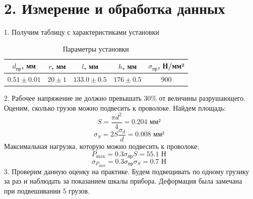 \documentclass[12pt,a4paper]{article}
\begin{document}
\section*{2. Измерение и обработка данных}
1. Получим таблицу с характеристиками установки
\begin{table}[H]
    \centering
    \caption{Параметры установки}
    \label{tab:metka}
    \begin{tabular}{|c|c|c|c|c|}
        \hline
        $d_{\text{пр}}$, мм & $r$, мм & $l$, мм & $h$, мм & $\sigma_{\text{пр}}$, Н/мм² \\
        \hline
        $0.51 \pm 0.01$ & $20 \pm 1$ & $133.0 \pm 0.5$ & $176 \pm 0.5$ & 900 \\
        \hline
    \end{tabular}
\end{table}
2. Рабочее напряжение не должно превышать 30\% от величины разрушающего. Оценим,
сколько грузов можно подвесить к проволоке. Найдем площадь:
\[
    S = \frac{\pi d^2}{4} = 0.204 \text{ мм²}
\]
\[
\sigma_S = 2S \frac{\sigma_d}{d} = 0.008 \text{ мм²}
\]
Максимальная нагрузка, которую можно подвесить к проволоке:
\[
    P_{\text{max}} = 0.3 \sigma_{\text{пр}} S = 55.1 \text{ Н}
\]
\[
    \sigma_{P_{\text{max}}} = 0.3 \sigma_{\text{пр}} \sigma_S = 0.7 \text{ Н}
\]
3. Проверим данную оценку на практике. Будем подвещивать по одному грузику за раз и
наблюдать за показанием шкалы прибора. Деформация была замечана при подвешивании 5 грузов.
\end{document}
